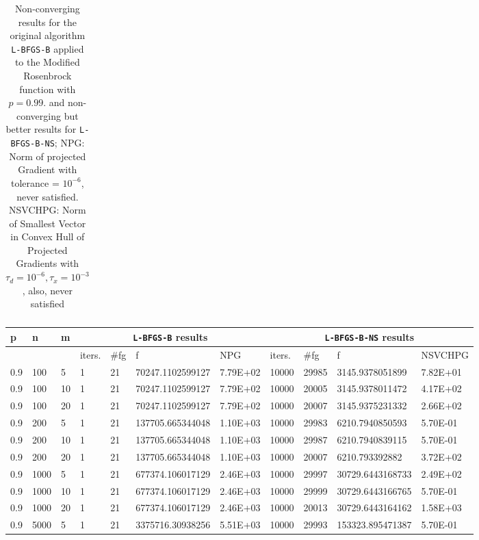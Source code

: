 \begin{table}
\begin{center}
\begin{tabular}{|l|l|l|l|l|l|l|l|l|l|l|}
      \hline
    \end{tabular}
    \caption[A value where \texttt{L-BFGS-B-NS} is supposed to fail. $p = 0.99$]{Non-converging results for the original algorithm \texttt{L-BFGS-B} applied to the Modified Rosenbrock function with $p = 0.99$.  and non-converging but better results for \texttt{L-BFGS-B-NS}; NPG: Norm of projected Gradient with tolerance = $10^{-6}$, never satisfied. NSVCHPG: Norm of Smallest Vector in Convex Hull of Projected Gradients with $\tau_d = 10^{-6}, \tau_x = 10^{-3}$, also, never satisfied}
    \label{p099}
  \end{center}
\end{table}

\begin{table}
  \tiny
  \begin{center}
    \begin{tabular}{|l|l|l|l|l|l|l|l|l|l|l|}
      \hline
      p  & n & m  & \multicolumn{4}{|c|}{\texttt{L-BFGS-B} results} & \multicolumn{4}{|c|}{\texttt{L-BFGS-B-NS} results} \\ \hline
      &  &  & iters. & \#fg & f & NPG & iters. & \#fg & f & NSVCHPG \\ \hline
      0.9 & 100 & 5 & 1 & 21 & 70247.1102599127 & 7.79E+02 & 10000 & 29985 & 3145.9378051899 & 7.82E+01\\
      0.9 & 100 & 10 & 1 & 21 & 70247.1102599127 & 7.79E+02 & 10000 & 20005 & 3145.9378011472 & 4.17E+02\\
      0.9 & 100 & 20 & 1 & 21 & 70247.1102599127 & 7.79E+02 & 10000 & 20007 & 3145.9375231332 & 2.66E+02\\
      0.9 & 200 & 5 & 1 & 21 & 137705.665344048 & 1.10E+03 & 10000 & 29983 & 6210.7940850593 & 5.70E-01\\
      0.9 & 200 & 10 & 1 & 21 & 137705.665344048 & 1.10E+03 & 10000 & 29987 & 6210.7940839115 & 5.70E-01\\
      0.9 & 200 & 20 & 1 & 21 & 137705.665344048 & 1.10E+03 & 10000 & 20007 & 6210.793392882 & 3.72E+02\\
      0.9 & 1000 & 5 & 1 & 21 & 677374.106017129 & 2.46E+03 & 10000 & 29997 & 30729.6443168733 & 2.49E+02\\
      0.9 & 1000 & 10 & 1 & 21 & 677374.106017129 & 2.46E+03 & 10000 & 29999 & 30729.6443166765 & 5.70E-01\\
      0.9 & 1000 & 20 & 1 & 21 & 677374.106017129 & 2.46E+03 & 10000 & 20013 & 30729.6443164162 & 1.58E+03\\
      0.9 & 5000 & 5 & 1 & 21 & 3375716.30938256 & 5.51E+03 & 10000 & 29993 & 153323.895471387 & 5.70E-01\\

\end{tabular}
\end{center}
\end{table}
